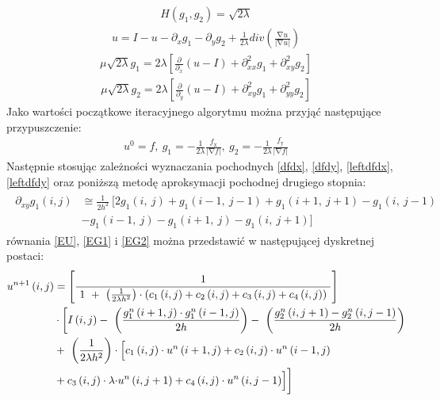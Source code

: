 \documentclass[12pt, twoside, openany]{report}
\theoremstyle{definition}
\begin{document}
\begin{align}
H\left(g_1,g_2\right)=\sqrt{2\lambda }
\end{align}
\begin{align}
u=I-u-{\partial }_xg_1-{\partial }_yg_2+\frac{1}{2\lambda }div\left(\frac{\mathrm{\nabla }u}{\left|\mathrm{\nabla }u\right|}\right)
\label{EU}
\end{align}
\begin{align}
\mu \sqrt{2\lambda }g_1=2\lambda \left[\frac{\partial }{{\partial }_x}\left(u-I\right)+{\partial }^2_{xx}g_1+{\partial }^2_{xy}g_2\right]
\label{EG1}
\end{align}
\begin{align}
\mu \sqrt{2\lambda }g_2=2\lambda \left[\frac{\partial }{{\partial }_y}\left(u-I\right)+{\partial }^2_{xy}g_1+{\partial }^2_{yy}g_2\right]
\label{EG2}
\end{align}
Jako wartości początkowe iteracyjnego algorytmu można przyjąć następujące przypuszczenie:
\begin{align}
u^0=f,\ g_1=-\frac{1}{2\lambda }\frac{f_{\mathrm{x}}}{\left|\mathrm{\nabla }f\right|},\ g_2=-\frac{1}{2\lambda }\frac{f_{\mathrm{y}}}{\left|\mathrm{\nabla }f\right|}
\end{align}
Następnie stosując zależności wyznaczania pochodnych \eqref{dfdx}, \eqref{dfdy}, \eqref{leftdfdx}, \eqref{leftdfdy} oraz poniższą metodę aproksymacji pochodnej drugiego stopnia:
\begin{align}
\begin{aligned} 
{\partial }_{xy}g_1\left(i,j\right) &\cong \frac{1}{2h^2}\ \bigg[2g_1\left(i,\ j\right)+g_1\left(i-1,\ j-1\right)+g_1\left(i+1,\ j+1\right)-g_1\left(i,\ j-1\right) \\ 
&-g_1\left(i-1,\ j\right)-g_1\left(i+1,\ j\right)-g_1\left(i,\ j+1\right)\bigg]
\end{aligned}
\end{align}
równania \eqref{EU}, \eqref{EG1} i \eqref{EG2} można przedstawić w następującej dyskretnej postaci:
\begin{align}
\begin{aligned}
u^{n+1}\left(i,j\right) &= \left[\frac{1}{\ 1\ +\ \left(\frac{1}{2\lambda h^2}\right)\cdot \left(c_1\left(i,j\right)+c_2\left(i,j\right)+c_3\left(i,j\right)+c_4\left(i,j\right)\right)\ }\right] \\ 
&\cdot \biggl[I\left(i,j\right)-\ \left(\frac{g^n_1\left(i+1,j\right)\cdot g^n_1\left(i-1,j\right)}{2h}\right)-\ \left(\frac{g^n_2\left(i,j+1\right)-g^n_2\left(i,j-1\right)}{2h}\right) \\ 
&+\ \left(\frac{1}{2\lambda h^2}\right)\cdot \Bigl[c_1\left(i,j\right)\cdot u^n\left(i+1,j\right)+c_2\left(i,j\right)\cdot u^n\left(i-1,j\right) \\
&+c_3\left(i,j\right)\cdot \lambda {\cdot u}^n\left(i,j+1\right)+c_4\left(i,j\right)\cdot u^n\left(i,j-1\right)\Bigr]\biggr]
\end{aligned}
\end{align}
\end{document}
